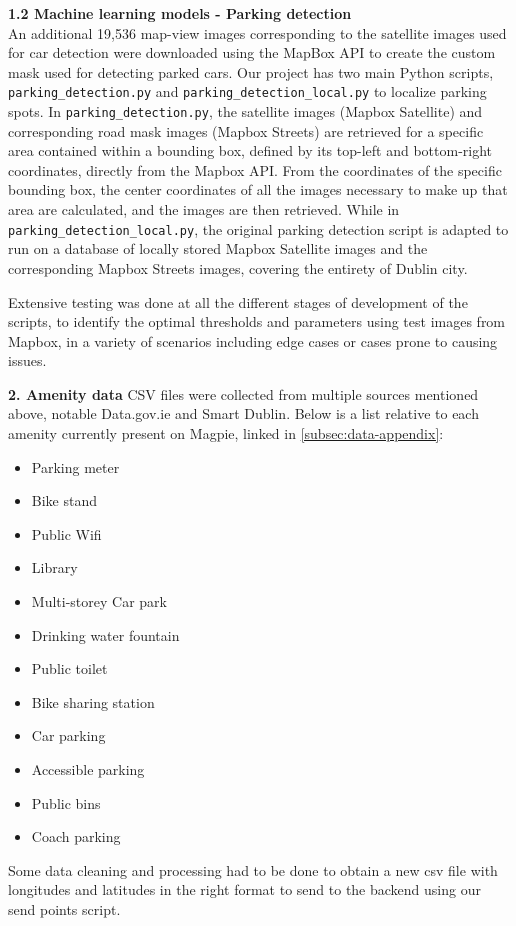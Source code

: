 \textbf{1.2 Machine learning models - Parking detection} \\
An additional 19,536 map-view images corresponding to the satellite images used
for car detection were downloaded using the MapBox API to create the custom mask
used for detecting parked cars. Our project has two main Python scripts,
\texttt{parking\_detection.py} and \texttt{parking\_detection\_local.py} to
localize parking spots. In \texttt{parking\_detection.py}, the satellite images
(Mapbox Satellite) and corresponding road mask images (Mapbox Streets) are
retrieved for a specific area contained within a bounding box, defined by its
top-left and bottom-right coordinates, directly from the Mapbox API. From the
coordinates of the specific bounding box, the center coordinates of all the
images necessary to make up that area are calculated, and the images are then
retrieved. While in \texttt{parking\_detection\_local.py}, the original parking
detection script is adapted to run on a database of locally stored Mapbox
Satellite images and the corresponding Mapbox Streets images, covering the
entirety of Dublin city.

Extensive testing was done at all the different stages of development of
the scripts, to identify the optimal thresholds and parameters using test images
from Mapbox, in a variety of scenarios including edge cases or cases prone to
causing issues.

\newpage{}

\textbf{2. Amenity data}
CSV files were collected from multiple sources mentioned above, notable
Data.gov.ie and Smart Dublin. Below is a list relative to each amenity currently
present on Magpie, linked in \ref{subsec:data-appendix}:
\begin{itemize}
    \item Parking meter
    \item Bike stand
    \item Public Wifi
    \item Library
    \item Multi-storey Car park
    \item Drinking water fountain
    \item Public toilet
    \item Bike sharing station
    \item Car parking
    \item Accessible parking
    \item Public bins
    \item Coach parking
\end{itemize}
Some data cleaning and processing had to be done to obtain a new csv file with
longitudes and latitudes in the right format to send to the backend using our
send points script.

